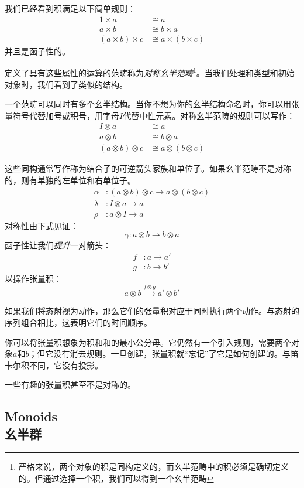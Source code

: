 \documentclass[DaoFP]{subfiles}
\begin{document}
 我们已经看到积满足以下简单规则：
 \begin{align*}
  1 \times a &\cong a
  \\
  a \times b &\cong b \times a
  \\
  (a \times b) \times c &\cong a \times (b \times c)
 \end{align*}
 并且是函子性的。

 定义了具有这些属性的运算的范畴称为\emph{对称幺半范畴}\footnote{严格来说，两个对象的积是同构定义的，而幺半范畴中的积必须是确切定义的。但通过选择一个积，我们可以得到一个幺半范畴}。当我们处理和类型和初始对象时，我们看到了类似的结构。

 一个范畴可以同时有多个幺半结构。当你不想为你的幺半结构命名时，你可以用张量符号代替加号或积号，用字母$I$代替中性元素。对称幺半范畴的规则可以写作：
 \begin{align*}
  I \otimes a &\cong a
  \\
  a \otimes b &\cong b \otimes a
  \\
  (a \otimes b) \otimes c &\cong a \otimes (b \otimes c)
 \end{align*}

 这些同构通常写作称为结合子的可逆箭头家族和单位子。如果幺半范畴不是对称的，则有单独的左单位和右单位子。
 \begin{align*}
  \alpha &\colon (a \otimes b) \otimes c \to a \otimes (b \otimes c)
  \\
  \lambda &\colon I \otimes a \to a
  \\
  \rho &\colon a \otimes I \to a
 \end{align*}
 对称性由下式见证：
 \[ \gamma \colon a \otimes b \to b \otimes a \]
 函子性让我们\emph{提升}一对箭头：
 \begin{align*}
  f &\colon a \to a' \\
  g &\colon b \to b'
 \end{align*}
 以操作张量积：
 \[ a \otimes b \xrightarrow{f \otimes g} a' \otimes b' \]

 如果我们将态射视为动作，那么它们的张量积对应于同时执行两个动作。与态射的序列组合相比，这表明它们的时间顺序。

 你可以将张量积想象为积和和的最小公分母。它仍然有一个引入规则，需要两个对象$a$和$b$；但它没有消去规则。一旦创建，张量积就“忘记”了它是如何创建的。与笛卡尔积不同，它没有投影。

 一些有趣的张量积甚至不是对称的。

 \subsection{Monoids\\幺半群}
\end{document}
